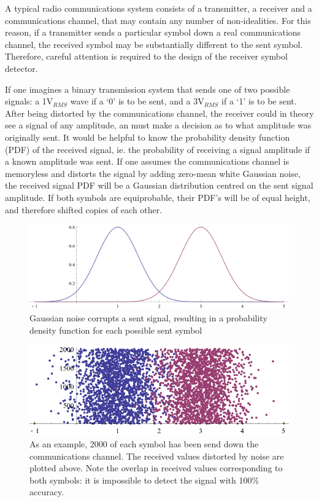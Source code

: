 A typical radio communications system consists of a transmitter, a
receiver and a communications channel, that may contain any number of
non-idealities. For this reason, if a transmitter sends a particular
symbol down a real communications channel, the received symbol may be
substantially different to the sent symbol. Therefore, careful attention
is required to the design of the receiver symbol detector.

If one imagines a binary transmission system that sends one of two
possible signals: a 1V$_{RMS}$ wave if a `0' is to be sent, and a
3V$_{RMS}$ if a `1' is to be sent. After being distorted by the
communications channel, the receiver could in theory see a signal of any
amplitude, an must make a decision as to what amplitude was originally
sent. It would be helpful to know the probability density function (PDF)
of the received signal, ie. the probability of receiving a signal
amplitude if a known amplitude was sent. If one assumes the communications
channel is memoryless and distorts the signal by adding zero-mean white Gaussian noise,
the received signal PDF will be a Gaussian distribution centred on the
sent signal amplitude. If both symbols are equiprobable, their PDF's will be of equal height, and therefore shifted copies of each other.

\begin{figure}[htbp]
\centering
\includegraphics[width=\linewidth]{4-PAM_PDF.png}
\caption{Gaussian noise corrupts a sent signal, resulting in a
probability density function for each possible sent symbol}
\end{figure}

\begin{figure}[htbp]
\centering
\includegraphics[width=\linewidth]{4-PAM_samples.png}
\caption{As an example, 2000 of each symbol has been send down the
communications channel. The received values distorted by noise are
plotted above. Note the overlap in received values corresponding to both
symbols: it is impossible to detect the signal with 100\% accuracy.}
\end{figure}

